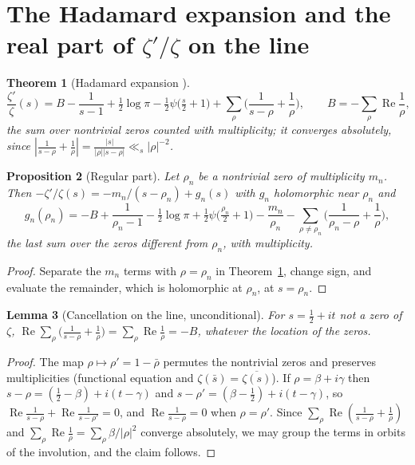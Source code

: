 \documentclass[11pt]{amsart}
\newtheorem{theorem}{Theorem}[section]
\newtheorem{proposition}[theorem]{Proposition}
\newtheorem{lemma}[theorem]{Lemma}
\theoremstyle{definition}
\theoremstyle{remark}
\renewcommand{\Re}{\operatorname{Re}}
\newcommand{\half}{\tfrac12}
\newcommand{\rhon}{\rho_n}
\newcommand{\psidig}{\psi}
\begin{document}
\section{The Hadamard expansion and the real part of \texorpdfstring{$\zeta'/\zeta$}{zeta'/zeta} on the line}
\label{sec:hadamard}

\begin{theorem}[Hadamard expansion {\cite[Ch.~12]{Davenport}}]\label{thm:had}
\[
\frac{\zeta'}{\zeta}(s)=B-\frac1{s-1}+\tfrac12\log\pi-\tfrac12\psidig\!\big(\tfrac s2+1\big)
+\sum_\rho\Big(\frac1{s-\rho}+\frac1\rho\Big),\qquad B=-\sum_\rho\Re\frac1\rho,
\]
the sum over nontrivial zeros counted with multiplicity; it converges absolutely, since
$|\frac1{s-\rho}+\frac1\rho|=\frac{|s|}{|\rho||s-\rho|}\ll_s|\rho|^{-2}$.
\end{theorem}

\begin{proposition}[Regular part]\label{prop:reg}
Let $\rhon$ be a nontrivial zero of multiplicity $m_n$. Then
$-\zeta'/\zeta(s)=-m_n/(s-\rhon)+g_n(s)$ with $g_n$ holomorphic near $\rhon$ and
\[
g_n(\rhon)=-B+\frac1{\rhon-1}-\tfrac12\log\pi+\tfrac12\psidig\!\big(\tfrac{\rhon}2+1\big)
-\frac{m_n}{\rhon}-\sum_{\rho\ne\rhon}\Big(\frac1{\rhon-\rho}+\frac1\rho\Big),
\]
the last sum over the zeros different from $\rhon$, with multiplicity.
\end{proposition}
\begin{proof}
Separate the $m_n$ terms with $\rho=\rhon$ in Theorem~\ref{thm:had}, change sign, and evaluate
the remainder, which is holomorphic at $\rhon$, at $s=\rhon$.
\end{proof}

\begin{lemma}[Cancellation on the line, unconditional]\label{lem:cancel}
For $s=\half+it$ not a zero of $\zeta$,
$\Re\sum_\rho\big(\frac1{s-\rho}+\frac1\rho\big)=\sum_\rho\Re\frac1\rho=-B$, whatever the
location of the zeros.
\end{lemma}
\begin{proof}
The map $\rho\mapsto\rho'=1-\bar\rho$ permutes the nontrivial zeros and preserves
multiplicities (functional equation and $\zeta(\bar s)=\overline{\zeta(s)}$). If
$\rho=\beta+i\gamma$ then $s-\rho=(\half-\beta)+i(t-\gamma)$ and $s-\rho'=(\beta-\half)+
i(t-\gamma)$, so $\Re\frac1{s-\rho}+\Re\frac1{s-\rho'}=0$, and $\Re\frac1{s-\rho}=0$ when
$\rho=\rho'$. Since $\sum_\rho\Re(\frac1{s-\rho}+\frac1\rho)$ and $\sum_\rho\Re\frac1\rho
=\sum_\rho\beta/|\rho|^2$ converge absolutely, we may group the terms in orbits of the
involution, and the claim follows.
\end{proof}
\end{document}
